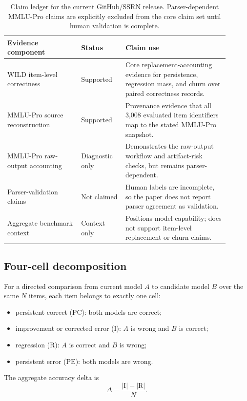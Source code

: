 \documentclass[manuscript, screen, review, nonacm]{jair}
\newcommand{\pc}{\mathrm{PC}}
\newcommand{\pe}{\mathrm{PE}}
\newcommand{\imp}{\mathrm{I}}
\newcommand{\reg}{\mathrm{R}}
\begin{document}
\begin{table}[t]
\centering
\small
\begin{tabular}{p{0.30\linewidth}p{0.18\linewidth}p{0.42\linewidth}}
\toprule
Evidence component & Status & Claim use \\
\midrule
WILD item-level correctness & Supported & Core replacement-accounting evidence for persistence, regression mass, and churn over paired correctness records. \\
MMLU-Pro source reconstruction & Supported & Provenance evidence that all 3,008 evaluated item identifiers map to the stated MMLU-Pro snapshot. \\
MMLU-Pro raw-output accounting & Diagnostic only & Demonstrates the raw-output workflow and artifact-risk checks, but remains parser-dependent. \\
Parser-validation claims & Not claimed & Human labels are incomplete, so the paper does not report parser agreement as validation. \\
Aggregate benchmark context & Context only & Positions model capability; does not support item-level replacement or churn claims. \\
\bottomrule
\end{tabular}
\caption{Claim ledger for the current GitHub/SSRN release. Parser-dependent MMLU-Pro claims are explicitly excluded from the core claim set until human validation is complete.}
\label{tab:claim-ledger}
\end{table}

\subsection{Four-cell decomposition}

For a directed comparison from current model $A$ to candidate model $B$ over the same $N$ items, each item belongs to exactly one cell:

\begin{itemize}
  \item persistent correct ($\pc$): both models are correct;
  \item improvement or corrected error ($\imp$): $A$ is wrong and $B$ is correct;
  \item regression ($\reg$): $A$ is correct and $B$ is wrong;
  \item persistent error ($\pe$): both models are wrong.
\end{itemize}

The aggregate accuracy delta is
\begin{equation}
\Delta = \frac{|\imp|-|\reg|}{N}.
\end{equation}
\end{document}
